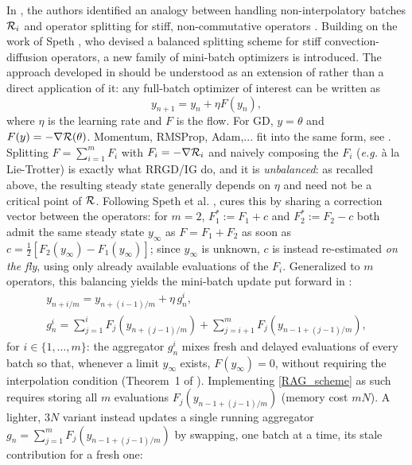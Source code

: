 In \cite{partI}, the authors identified an analogy between handling non-interpolatory batches $\mathcal{R}_i$
 and operator splitting for stiff, non-commutative operators \cite{rebalanced_splitting}. Building on the work of Speth \cite{rebalanced_splitting}, who devised a balanced splitting scheme for stiff convection-diffusion operators, a new family of mini-batch optimizers is introduced. The approach developed in \cite{partI} should be understood as an extension of \cite{rebalanced_splitting} rather than a direct application of it:
any full-batch optimizer of interest can be written as
\begin{equation}
	y_{n+1} = y_n+\eta F(y_n),
	\label{fb_opt}
\end{equation}
where $\eta$ is the learning rate and $F$ is the flow. For GD, $y=\theta$ and $F(y)=-\nabla \mathcal{R}(\theta)$. Momentum, RMSProp, Adam,... fit into the same form, see \cite{Barakat_bianchi}. 
Splitting $F=\sum_{i=1}^m F_i$ with $F_i=-\nabla \mathcal{R}_i$ and naively composing the $F_i$ (\emph{e.g.} \`a la Lie-Trotter) is exactly what RRGD/IG do, and it is {\em unbalanced}: as recalled above, the resulting steady state generally depends on $\eta$ and need not be a critical point of $\mathcal{R}$. Following Speth et al. \cite{rebalanced_splitting}, \cite{partI} cures this by sharing a correction vector between the operators: for $m=2$, $F_1^*:=F_1+c$ and $F_2^*:=F_2-c$ both admit the same steady state $y_\infty$ as $F=F_1+F_2$ as soon as $c=\frac12[F_2(y_\infty)-F_1(y_\infty)]$; since $y_\infty$ is unknown, $c$ is instead re-estimated {\em on the fly}, using only already available evaluations of the $F_i$. Generalized to $m$ operators, this balancing yields the mini-batch update put forward in \cite{partI}:
\begin{equation}
  \begin{array}{l}
	y_{n+i/m} = y_{n+(i-1)/m}+\eta\, g_n^i,\\
        g_n^i = \sum_{j=1}^i F_j\left(y_{n+(j-1)/m}\right)+\sum_{j=i+1}^m F_j\left(y_{n-1+(j-1)/m}\right),
  \end{array}
	\label{RAG_scheme}
\end{equation}
for $i\in\{1,\dots,m\}$: the aggregator $g_n^i$ mixes fresh and delayed evaluations of every batch so that, whenever a limit $y_\infty$ exists, $F(y_\infty)=0$, without requiring the interpolation condition (Theorem~1 of \cite{partI}). Implementing \eqref{RAG_scheme} as such requires storing all $m$ evaluations $F_j\left(y_{n-1+(j-1)/m}\right)$ (memory cost $mN$). A lighter, $3N$ variant instead updates a single running aggregator $g_n=\sum_{j=1}^m F_j\left(y_{n-1+(j-1)/m}\right)$ by swapping, one batch at a time, its stale contribution for a fresh one:
